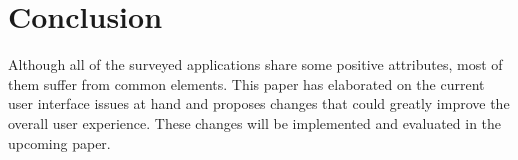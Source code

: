 \documentclass{sigchi}
\begin{document}
%
% 
% 

\section{Conclusion}
Although all of the surveyed applications share some positive attributes, most of them suffer from common elements. This paper has elaborated on the current user interface issues at hand and proposes changes that could greatly improve the overall user experience. These changes will be implemented and evaluated in the upcoming paper. 

%
%
%
%
%
\balance

%
%
\end{document}
